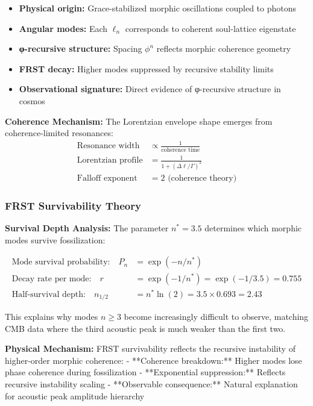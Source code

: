 \begin{itemize}
\item \textbf{Physical origin:} Grace-stabilized morphic oscillations coupled to photons
\item \textbf{Angular modes:} Each $\ell_n$ corresponds to coherent soul-lattice eigenstate
\item \textbf{φ-recursive structure:} Spacing $\phi^n$ reflects morphic coherence geometry
\item \textbf{FRST decay:} Higher modes suppressed by recursive stability limits
\item \textbf{Observational signature:} Direct evidence of φ-recursive structure in cosmos
\end{itemize}

\textbf{Coherence Mechanism:} The Lorentzian envelope shape emerges from coherence-limited resonances:
\begin{align}
\text{Resonance width} &\propto \frac{1}{\text{coherence time}} \\
\text{Lorentzian profile} &= \frac{1}{1 + (\Delta\ell/\Gamma)^2} \\
\text{Falloff exponent} &= 2 \text{ (coherence theory)}
\end{align}

\subsubsection{FRST Survivability Theory}

\textbf{Survival Depth Analysis:} The parameter $n^* = 3.5$ determines which morphic modes survive fossilization:

\begin{align}
\text{Mode survival probability:} \quad P_n &= \exp(-n/n^*) \\
\text{Decay rate per mode:} \quad r &= \exp(-1/n^*) = \exp(-1/3.5) = 0.755 \\
\text{Half-survival depth:} \quad n_{1/2} &= n^* \ln(2) = 3.5 \times 0.693 = 2.43
\end{align}

This explains why modes $n \geq 3$ become increasingly difficult to observe, matching CMB data where the third acoustic peak is much weaker than the first two.

\textbf{Physical Mechanism:} FRST survivability reflects the recursive instability of higher-order morphic coherence:
- **Coherence breakdown:** Higher modes lose phase coherence during fossilization
- **Exponential suppression:** Reflects recursive instability scaling
- **Observable consequence:** Natural explanation for acoustic peak amplitude hierarchy


